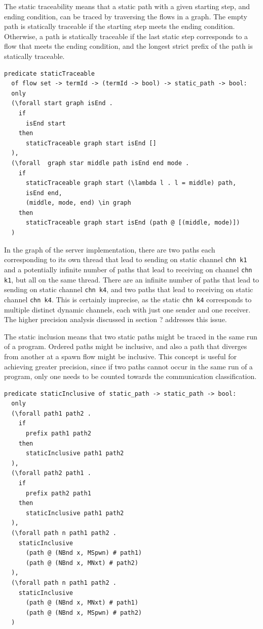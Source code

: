 \documentclass[10pt]{article}
\begin{document}
The static traceability means that a static path with a given starting step, and ending
condition, can be traced by traversing the flows in a graph.
The empty path is statically traceable if the starting step meets the ending condition.
Otherwise, a path is statically traceable if the last static step corresponds to a flow
that meets the ending condition, and the longest strict prefix of the path is statically
traceable.  

\begin{lstlisting}[language=logic, mathescape]
  predicate staticTraceable
  of flow set -> termId -> (termId -> bool) -> static_path -> bool:
  only
  (\forall start graph isEnd .
    if
      isEnd start
    then
      staticTraceable graph start isEnd []
  ),
  (\forall  graph star middle path isEnd end mode .
    if 
      staticTraceable graph start (\lambda l . l = middle) path, 
      isEnd end, 
      (middle, mode, end) \in graph 
    then
      staticTraceable graph start isEnd (path @ [(middle, mode)])
  )
\end{lstlisting}

In the graph of the server implementation, there are two paths each corresponding to its
own thread that lead
to sending on
static channel \lstinline[language=sugar_lang]{chn k1} and a potentially infinite number of
paths that lead to receiving on
channel \lstinline[language=sugar_lang]{chn k1}, but all on the same thread.
There are an infinite number of paths that lead
to sending on static channel \lstinline[language=sugar_lang]{chn k4}, and two paths
that lead to receiving on static channel
\lstinline[language=sugar_lang]{chn k4}. This is certainly imprecise,
as the static \lstinline[language=sugar_lang]{chn k4} corresponds to
multiple distinct dynamic channels, each with just one sender and one receiver.  The higher
precision analysis discussed in section ? addresses this issue.

The static inclusion means that two static paths might be traced in
the same run of a program. Ordered paths might be inclusive, and also a path that diverges
from another at a spawn flow might be inclusive. This concept is useful for achieving
greater precision, since if two paths cannot occur in the same run of a program, only one needs
to be counted towards the communication classification. 

\begin{lstlisting}[language=logic, mathescape]
  predicate staticInclusive of static_path -> static_path -> bool:
  only
  (\forall path1 path2 .
    if
      prefix path1 path2
    then
      staticInclusive path1 path2
  ),
  (\forall path2 path1 .
    if
      prefix path2 path1
    then
      staticInclusive path1 path2
  ),
  (\forall path n path1 path2 .
    staticInclusive
      (path @ (NBnd x, MSpwn) # path1)
      (path @ (NBnd x, MNxt) # path2)
  ),
  (\forall path n path1 path2 .
    staticInclusive
      (path @ (NBnd x, MNxt) # path1)
      (path @ (NBnd x, MSpwn) # path2)
  )
\end{lstlisting}
\end{document}
